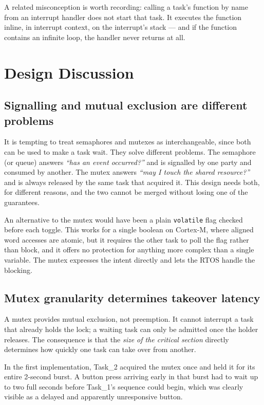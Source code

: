 \documentclass[11pt,a4paper]{article}
\begin{document}
A related misconception is worth recording: calling a task's function by name
from an interrupt handler does not start that task. It executes the function
inline, in interrupt context, on the interrupt's stack --- and if the function
contains an infinite loop, the handler never returns at all.

\section{Design Discussion}

\subsection{Signalling and mutual exclusion are different problems}

It is tempting to treat semaphores and mutexes as interchangeable, since both
can be used to make a task wait. They solve different problems. The semaphore
(or queue) answers \emph{``has an event occurred?''} and is signalled by one
party and consumed by another. The mutex answers \emph{``may I touch the
shared resource?''} and is always released by the same task that acquired it.
This design needs both, for different reasons, and the two cannot be merged
without losing one of the guarantees.

An alternative to the mutex would have been a plain \texttt{volatile} flag
checked before each toggle. This works for a single boolean on Cortex-M, where
aligned word accesses are atomic, but it requires the other task to poll the
flag rather than block, and it offers no protection for anything more complex
than a single variable. The mutex expresses the intent directly and lets the
RTOS handle the blocking.

\subsection{Mutex granularity determines takeover latency}
\label{sec:granularity}

A mutex provides mutual exclusion, not preemption. It cannot interrupt a task
that already holds the lock; a waiting task can only be admitted once the
holder releases. The consequence is that the \emph{size of the critical
section} directly determines how quickly one task can take over from another.

In the first implementation, Task\_2 acquired the mutex once and held it for
its entire 2-second burst. A button press arriving early in that burst had to
wait up to two full seconds before Task\_1's sequence could begin, which was
clearly visible as a delayed and apparently unresponsive button.
\end{document}
